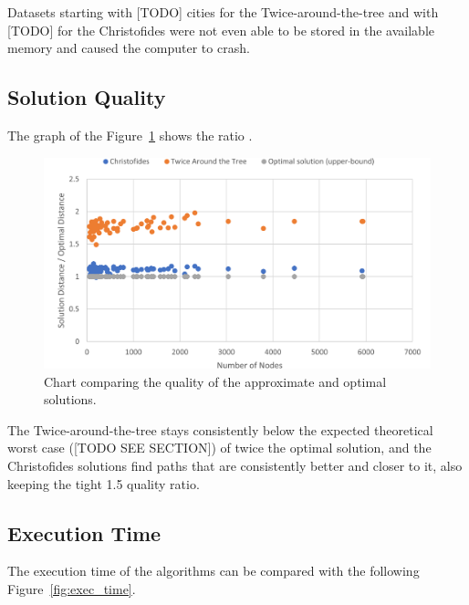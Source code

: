 \documentclass[12pt]{article}
\begin{document}
Datasets starting with [TODO] cities for the Twice-around-the-tree and with [TODO] for the Christofides were 
not even able to be stored in the available memory and caused the computer to crash.


\subsection{Solution Quality} \label{sec:exp_quality}

The graph of the Figure~\ref{fig:quality_ratio} shows the ratio .

\begin{figure}[ht]
\centering
\includegraphics[height=.325\textheight]{quality_ratio.png}
\caption{Chart comparing the quality of the approximate and optimal solutions.}
\label{fig:quality_ratio}
\end{figure}

The Twice-around-the-tree stays consistently below the expected theoretical worst case ([TODO SEE SECTION]) of 
twice the optimal solution, and the Christofides solutions find paths that are consistently better and closer to it, 
also keeping the tight 1.5 quality ratio.

\subsection{Execution Time} \label{sec:exp_time}

The execution time of the algorithms can be compared with the following Figure~\ref{fig:exec_time}.
\end{document}
